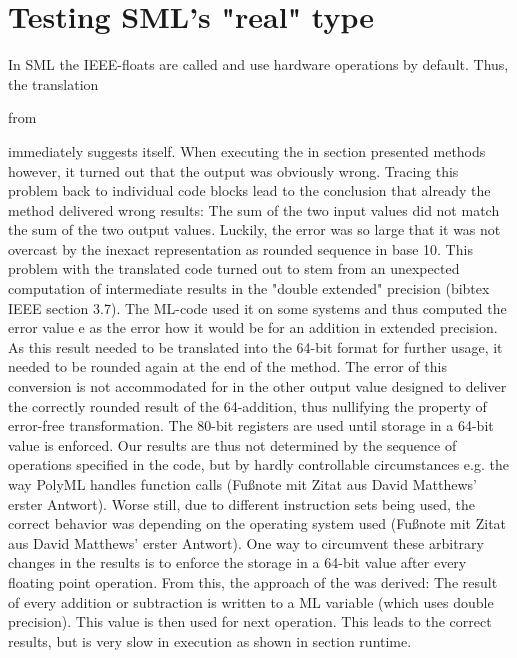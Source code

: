 \documentclass[11pt,a4paper]{article}
\begin{document}
\section{Testing SML's "real" type}

In SML the IEEE-floats are called
and use hardware operations by default. Thus, the translation

from
 
immediately suggests itself. When executing the in section     presented methods however, it turned out that the output was obviously wrong. Tracing this problem back to individual code blocks lead to the conclusion that already the
method delivered wrong results: The sum of the two input values did not match the sum of the two output values. Luckily, the error was so large that it was not overcast by the inexact representation as rounded sequence in base 10.
This problem with the translated code turned out to stem from an unexpected computation of intermediate results in the "double extended" precision (bibtex IEEE section 3.7). The ML-code used it on some systems and thus computed the error value e as the error how it would be for an addition in extended precision. As this result needed to be translated into the 64-bit format for further usage, it needed to be rounded again at the end of the method. The error of this conversion is not accommodated for in the other output value designed to deliver the correctly rounded result of the 64-addition, thus nullifying the property of error-free transformation. The 80-bit registers are used until storage in a 64-bit value is enforced. Our results are thus not determined by the sequence of operations specified in the code, but by hardly controllable circumstances e.g. the way PolyML handles function calls (Fußnote mit Zitat aus David Matthews' erster Antwort). Worse still, due to different instruction sets being used, the correct behavior was depending on the operating system used (Fußnote mit Zitat aus David Matthews' erster Antwort). One way to circumvent these arbitrary changes in the results is to enforce the storage in a 64-bit value after every floating point operation. From this, the approach of the
was derived: The result of every addition or subtraction is written to a ML variable (which uses double precision). This value is then used for next operation. This leads to the correct results, but is very slow in execution as shown in section runtime.
\end{document}
